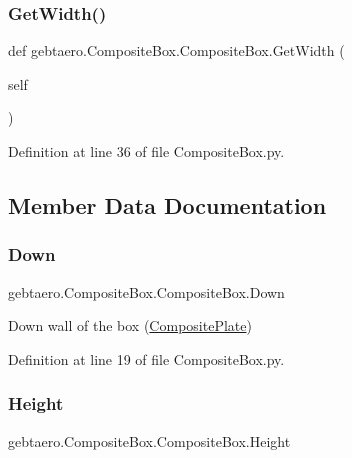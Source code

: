 \subsubsection{\texorpdfstring{Get\+Width()}{GetWidth()}}
{\footnotesize\ttfamily def gebtaero.\+Composite\+Box.\+Composite\+Box.\+Get\+Width (\begin{DoxyParamCaption}\item[{}]{self }\end{DoxyParamCaption})}



Definition at line 36 of file Composite\+Box.\+py.



\subsection{Member Data Documentation}
\mbox{\label{classgebtaero_1_1_composite_box_1_1_composite_box_ad1559917cabe3fcb6c05bf603d8b0b0c}} 
\subsubsection{\texorpdfstring{Down}{Down}}
{\footnotesize\ttfamily gebtaero.\+Composite\+Box.\+Composite\+Box.\+Down}



Down wall of the box (\hyperlink{namespacegebtaero_1_1_composite_plate}{Composite\+Plate}) 



Definition at line 19 of file Composite\+Box.\+py.

\mbox{\label{classgebtaero_1_1_composite_box_1_1_composite_box_affc2b38183c3b0ec7534629cf63e4cc5}} 
\subsubsection{\texorpdfstring{Height}{Height}}
{\footnotesize\ttfamily gebtaero.\+Composite\+Box.\+Composite\+Box.\+Height}



